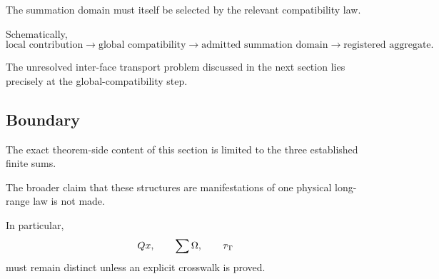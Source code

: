 The summation domain must itself be selected by the relevant
compatibility law.

Schematically,
\[
\text{local contribution}
\longrightarrow
\text{global compatibility}
\longrightarrow
\text{admitted summation domain}
\longrightarrow
\text{registered aggregate}.
\]

The unresolved inter-face transport problem discussed in the next
section lies precisely at the global-compatibility step.

\subsection{Boundary}

The exact theorem-side content of this section is limited to the
three established finite sums.

The broader claim that these structures are manifestations of one
physical long-range law is not made.

In particular,
\[
Qx,
\qquad
\sum\Omega,
\qquad
\tau_{\mathrm{T}}
\]
must remain distinct unless an explicit crosswalk is proved.
